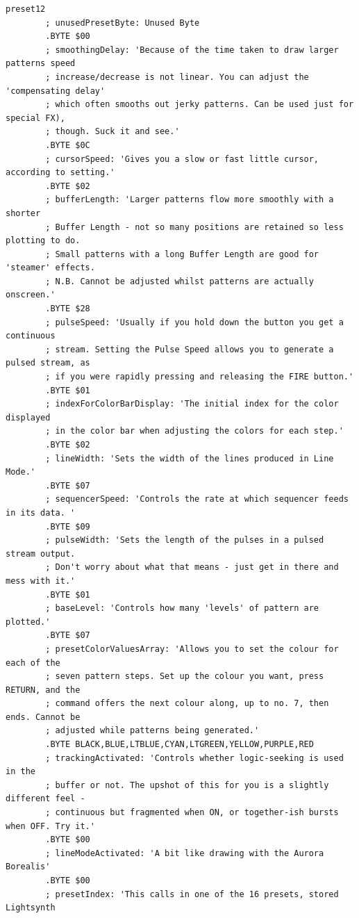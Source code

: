 \begin{lstlisting}[basicstyle=\tiny,caption=Source code for Preset 12.]
preset12
        ; unusedPresetByte: Unused Byte
        .BYTE $00
        ; smoothingDelay: 'Because of the time taken to draw larger patterns speed
        ; increase/decrease is not linear. You can adjust the 'compensating delay'
        ; which often smooths out jerky patterns. Can be used just for special FX),
        ; though. Suck it and see.'
        .BYTE $0C
        ; cursorSpeed: 'Gives you a slow or fast little cursor, according to setting.'
        .BYTE $02
        ; bufferLength: 'Larger patterns flow more smoothly with a shorter
        ; Buffer Length - not so many positions are retained so less plotting to do.
        ; Small patterns with a long Buffer Length are good for 'steamer' effects.
        ; N.B. Cannot be adjusted whilst patterns are actually onscreen.'
        .BYTE $28
        ; pulseSpeed: 'Usually if you hold down the button you get a continuous
        ; stream. Setting the Pulse Speed allows you to generate a pulsed stream, as
        ; if you were rapidly pressing and releasing the FIRE button.'
        .BYTE $01
        ; indexForColorBarDisplay: 'The initial index for the color displayed
        ; in the color bar when adjusting the colors for each step.'
        .BYTE $02
        ; lineWidth: 'Sets the width of the lines produced in Line Mode.'
        .BYTE $07
        ; sequencerSpeed: 'Controls the rate at which sequencer feeds in its data. '
        .BYTE $09
        ; pulseWidth: 'Sets the length of the pulses in a pulsed stream output.
        ; Don't worry about what that means - just get in there and mess with it.'
        .BYTE $01
        ; baseLevel: 'Controls how many 'levels' of pattern are plotted.'
        .BYTE $07
        ; presetColorValuesArray: 'Allows you to set the colour for each of the
        ; seven pattern steps. Set up the colour you want, press RETURN, and the
        ; command offers the next colour along, up to no. 7, then ends. Cannot be
        ; adjusted while patterns being generated.'
        .BYTE BLACK,BLUE,LTBLUE,CYAN,LTGREEN,YELLOW,PURPLE,RED
        ; trackingActivated: 'Controls whether logic-seeking is used in the
        ; buffer or not. The upshot of this for you is a slightly different feel -
        ; continuous but fragmented when ON, or together-ish bursts when OFF. Try it.'
        .BYTE $00
        ; lineModeActivated: 'A bit like drawing with the Aurora Borealis'
        .BYTE $00
        ; presetIndex: 'This calls in one of the 16 presets, stored Lightsynth

\end{lstlisting}
